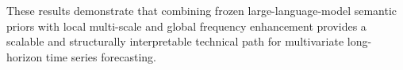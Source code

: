 These results demonstrate that combining frozen large-language-model semantic priors with local multi-scale and global frequency enhancement provides a scalable and structurally interpretable technical path for multivariate long-horizon time series forecasting.

